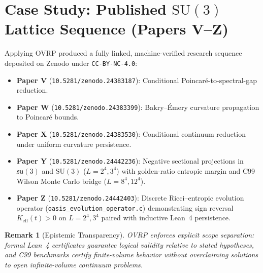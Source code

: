 \documentclass[11pt,a4paper]{article}
\newtheorem{remark}{Remark}[section]
\begin{document}
\section{Case Study: Published $\mathrm{SU}(3)$ Lattice Sequence (Papers V--Z)}
Applying OVRP produced a fully linked, machine-verified research sequence deposited on Zenodo under \texttt{CC-BY-NC-4.0}:
\begin{itemize}
  \item \textbf{Paper V} (\texttt{10.5281/zenodo.24383187}): Conditional Poincar\'e-to-spectral-gap reduction.
  \item \textbf{Paper W} (\texttt{10.5281/zenodo.24383399}): Bakry--\'Emery curvature propagation to Poincar\'e bounds.
  \item \textbf{Paper X} (\texttt{10.5281/zenodo.24383530}): Conditional continuum reduction under uniform curvature persistence.
  \item \textbf{Paper Y} (\texttt{10.5281/zenodo.24442236}): Negative sectional projections in $\mathfrak{su}(3)$ and $\mathrm{SU}(3)$ ($L=2^4, 3^4$) with golden-ratio entropic margin and C99 Wilson Monte Carlo bridge ($L=8^4, 12^4$).
  \item \textbf{Paper Z} (\texttt{10.5281/zenodo.24442403}): Discrete Ricci--entropic evolution operator (\texttt{oasis\_evolution\_operator.c}) demonstrating sign reversal $K_{\mathrm{eff}}(t) > 0$ on $L=2^4, 3^4$ paired with inductive Lean~4 persistence.
\end{itemize}

\begin{remark}[Epistemic Transparency]
OVRP enforces explicit scope separation: formal Lean~4 certificates guarantee logical validity relative to stated hypotheses, and C99 benchmarks certify finite-volume behavior without overclaiming solutions to open infinite-volume continuum problems.
\end{remark}
\end{document}
